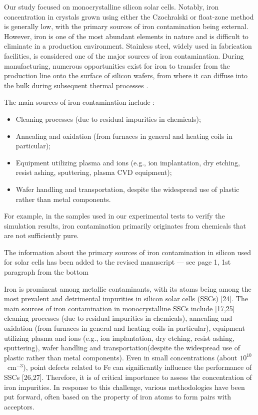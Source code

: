 \documentclass[a4paper,fleqn]{cas-sc}
\begin{document}
Our study focused on monocrystalline silicon solar cells.
Notably, iron concentration in crystals grown using either the Czochralski or float-zone method is generally low,
with the primary sources of iron contamination being external.
However, iron is one of the most abundant elements in nature and is difficult to eliminate in a production environment.
Stainless steel, widely used in fabrication facilities, is considered one of the major sources of iron contamination.
During manufacturing, numerous opportunities exist for iron to transfer from the production line onto the surface of silicon wafers,
from where it can diffuse into the bulk during subsequent thermal processes \cite{Istratov2000, Abbott2014}.

The main sources of iron contamination include \cite{Istratov2000, Abbott2014}:
\begin{itemize}[itemsep=2pt, parsep=0pt, topsep=0pt]
    \item Cleaning processes (due to residual impurities in chemicals);
    \item Annealing and oxidation (from furnaces in general and heating coils in particular);
    \item Equipment utilizing plasma and ions (e.g., ion implantation, dry etching, resist ashing, sputtering, plasma CVD equipment);
    \item Wafer handling and transportation, despite the widespread use of plastic rather than metal components.
\end{itemize}

For example, in the samples used in our experimental tests to verify the simulation results,
iron contamination primarily originates from chemicals that are not sufficiently pure.


The information about the primary sources of iron contamination in silicon used for solar cells has been added to the revised manuscript
--- see page 1, 1st paragraph from the bottom

\begin{mdframed}
Iron is prominent among metallic contaminants, with its atoms being among
the most prevalent and detrimental impurities in silicon solar cells (SSCs) [24].
\textcolor[rgb]{1.00,0.07,0.00}{The main sources of iron contamination in monocrystalline SSCs include [17,25]
cleaning processes (due to residual impurities in chemicals),
annealing and oxidation (from furnaces in general and heating coils in particular),
equipment utilizing plasma and ions (e.g., ion implantation, dry etching, resist ashing, sputtering),
wafer handling and transportation(despite the widespread use of plastic rather than metal components).}
Even in small concentrations (about $10^{10}$~cm$^{-3}$),
point defects related to Fe can significantly influence the performance of SSCs [26,27].
Therefore, it is of critical importance to assess the concentration of iron impurities.
In response to this challenge, various methodologies have been put forward,
often based on the property of iron atoms to form pairs with acceptors.
\end{mdframed}
\end{document}
